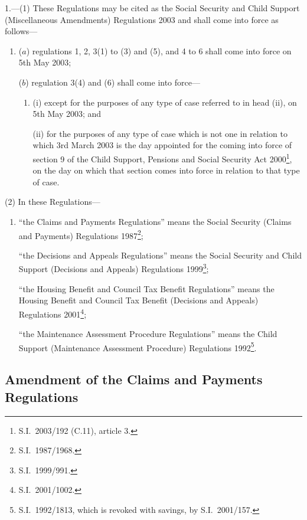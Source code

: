 \documentclass[12pt,a4paper]{article}
\begin{document}
1.---(1)  These Regulations may be cited as the Social Security and Child Support (Miscellaneous Amendments) Regulations 2003 and shall come into force as follows—
\begin{enumerate}\item[]
($a$) regulations 1, 2, 3(1) to (3) and (5), 
and 4 to 6  %
shall come into force on 5th May 2003;

($b$) regulation 3(4) and (6) shall come into force—
\begin{enumerate}\item[]
(i) except for the purposes of any type of case referred to in head (ii), on 5th May 2003; and

(ii) for the purposes of any type of case which is not one in relation to which 3rd March 2003 is the day appointed for the coming into force of section 9 of the Child Support, Pensions and Social Security Act 2000\footnote{S.I.\ 2003/192 (C.11), article 3.}, on the day on which that section comes into force in relation to that type of case.
\end{enumerate}
\end{enumerate}

(2) In these Regulations—
\begin{enumerate}\item[]
“the Claims and Payments Regulations” means the Social Security (Claims and Payments) Regulations 1987\footnote{S.I.\ 1987/1968.};

“the Decisions and Appeals Regulations” means the Social Security and Child Support (Decisions and Appeals) Regulations 1999\footnote{S.I.\ 1999/991.};

“the Housing Benefit and Council Tax Benefit Regulations” means the Housing Benefit and Council Tax Benefit (Decisions and Appeals) Regulations 2001\footnote{S.I.\ 2001/1002.};

“the Maintenance Assessment Procedure Regulations” means the Child Support (Maintenance Assessment Procedure) Regulations 1992\footnote{S.I.\ 1992/1813, which is revoked with savings, by S.I.\ 2001/157.}.
\end{enumerate}


\subsection[2. Amendment of the Claims and Payments Regulations]{Amendment of the Claims and Payments Regulations}
\end{document}
